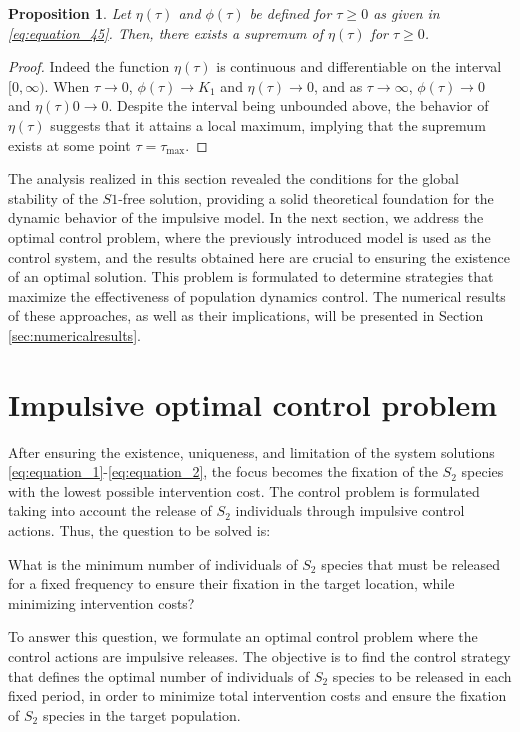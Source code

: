 \documentclass[10pt,letterpaper]{article}
\newtheorem{proposition}{Proposition}
\begin{document}
\begin{proposition}\label{prop:prop_4}
Let $\eta(\tau)$ and $\phi(\tau)$ be defined for $\tau \geq 0$ as given in \eqref{eq:equation_45}. Then, there exists a supremum of $\eta(\tau)$ for $\tau \geq 0$.
\end{proposition}
\begin{proof}
  Indeed the function $\eta(\tau)$ is continuous and differentiable on the interval $[0, \infty)$. When $\tau \to 0$, $\phi(\tau) \to K_1$ and $\eta(\tau) \to 0$, and as $ \tau \to \infty$, $\phi(\tau) \to 0$ and  $\eta(\tau)0\to 0$. Despite the interval being unbounded above, the behavior of $\eta(\tau)$ suggests that it attains a local maximum, implying that the supremum exists at some point $\tau = \tau_{\text{max}}$.  
\end{proof}

The analysis realized in this section revealed the conditions for the global stability of the $S1$-free solution, providing a solid theoretical foundation for the dynamic behavior of the impulsive model. In the next section, we address the optimal control problem, where the previously introduced model is used as the control system, and the results obtained here are crucial to ensuring the existence of an optimal solution. This problem is formulated to determine strategies that maximize the effectiveness of population dynamics control. The numerical results of these approaches, as well as their implications, will be presented in Section \eqref{sec:numericalresults}.

\section{Impulsive optimal control problem}
After ensuring the existence, uniqueness, and limitation of the system solutions \eqref{eq:equation_1}-\eqref{eq:equation_2}, the focus becomes the fixation of the $S_2$ species with the lowest possible intervention cost. The control problem is formulated taking into account the release of $S_2$ individuals through impulsive control actions. Thus, the question to be solved is:

What is the minimum number of individuals of $S_2$ species that must be released for a fixed frequency to ensure their fixation in the target location, while minimizing intervention costs?

To answer this question, we formulate an optimal control problem where the control actions are impulsive releases. The objective is to find the control strategy that defines the optimal number of individuals of $S_2$ species to be released in each fixed period, in order to minimize total intervention costs and ensure the fixation of $S_2$ species in the target population.
\end{document}
